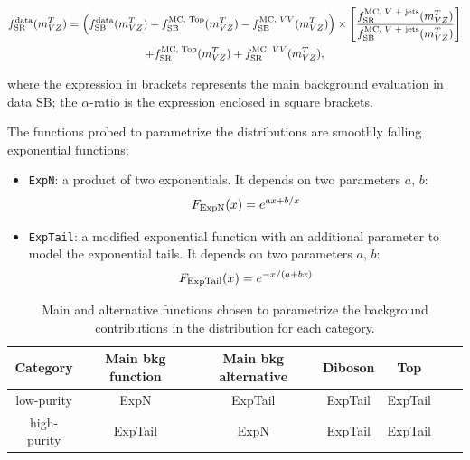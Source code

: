 \begin{equation}
\begin{gathered}
  f_{\text{SR}}^{\text{data}}(\mtVZ) = \left( f_{\text{SB}}^{\text{data}}(\mtVZ) - f_{\text{SB}}^{\text{MC, Top}}(\mtVZ) - f_{\text{SB}}^{\text{MC, \VV}}(\mtVZ) \right) \times \left[ \frac{f_{\text{SR}}^{\text{MC, \V + jets}}(\mtVZ)}{f_{\text{SB}}^{\text{MC, \V + jets}}(\mtVZ)} \right] \\
  + f_{\text{SR}}^{\text{MC, Top}}(\mtVZ) + f_{\text{SR}}^{\text{MC, \VV}}(\mtVZ), \\
\end{gathered}
\label{eq:shape_3}
\end{equation}

\noindent where the expression in brackets represents the main background evaluation in data SB; the $\alpha$-ratio is the expression enclosed in square brackets.

\noindent The functions probed to parametrize the \mtVZ distributions are smoothly falling exponential functions:

\begin{itemize}
  \item {\tt ExpN}: a product of two exponentials. It depends on two parameters $a$, $b$: $$F_{\rm ExpN}(x) = e^{ax+b/x}$$
  \item {\tt ExpTail}: a modified exponential function with an additional parameter to model the exponential tails. It depends on two parameters $a$, $b$: $$F_{\rm ExpTail}(x) = e^{-x/(a+bx)}$$
\end{itemize}

\begin{table}[!htb]
  \begin{center}
  \caption{Main and alternative functions chosen to parametrize the background contributions in the \mtVZ distribution for each category.}\label{tab:XMassFunctions}
    \begin{tabular}{c|cccccc}
      Category & Main bkg function & Main bkg alternative & Diboson & Top \\
      \hline
       \hline
       low-purity  & ExpN & ExpTail & ExpTail & ExpTail \\
      \hdashline
       high-purity  & ExpTail & ExpN & ExpTail & ExpTail \\
    \end{tabular}
  \end{center}

\end{table}

